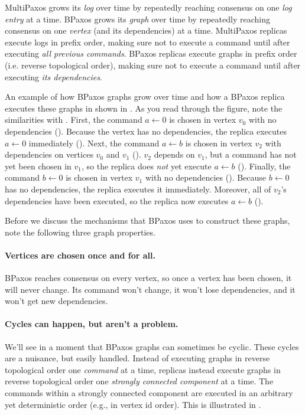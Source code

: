 MultiPaxos grows its \emph{log} over time by repeatedly reaching consensus on
one \emph{log entry} at a time. BPaxos grows its \emph{graph} over time by
repeatedly reaching consensus on one \emph{vertex} (and its dependencies) at a
time. MultiPaxos replicas execute logs in prefix order, making sure not to
execute a command until after executing \emph{all previous commands}. BPaxos
replicas execute graphs in prefix order (i.e. reverse topological order),
making sure not to execute a command until after executing \emph{its
dependencies}.

An example of how BPaxos graphs grow over time and how a BPaxos replica
executes these graphs in shown in . As you read
through the figure, note the similarities with
.
%
First, the command $a \gets 0$ is chosen in vertex $v_0$ with no dependencies
().
%
Because the vertex has no dependencies, the replica executes $a \gets 0$
immediately ().
%
Next, the command $a \gets b$ is chosen in vertex $v_2$ with dependencies on
vertices $v_0$ and $v_1$ ().
%
$v_2$ depends on $v_1$, but a command has not yet been chosen in $v_1$, so the
replica does \emph{not} yet execute $a \gets b$
().
%
Finally, the command $b \gets 0$ is chosen in vertex $v_1$ with no
dependencies ().
%
Because $b \gets 0$ has no dependencies, the replica executes it immediately.
Moreover, all of $v_2$'s dependencies have been executed, so the replica now
executes $a \gets b$ ().

{}

Before we discuss the mechanisms that BPaxos uses to construct these graphs,
note the following three graph properties.

\paragraph{Vertices are chosen once and for all.}
BPaxos reaches consensus on every vertex, so once a vertex has been chosen, it
will never change. Its command won't change, it won't lose dependencies,
and it won't get new dependencies.

\paragraph{Cycles can happen, but aren't a problem.}
We'll see in a moment that BPaxos graphs can sometimes be cyclic. These cycles
are a nuisance, but easily handled. Instead of executing graphs in reverse
topological order one \emph{command} at a time, replicas instead execute graphs
in reverse topological order one \emph{strongly connected component} at a time.
The commands within a strongly connected component are executed in an arbitrary
yet deterministic order (e.g., in vertex id order). This is illustrated in
.


